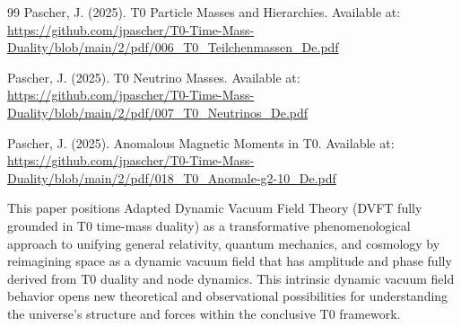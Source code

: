 \begin{thebibliography}{99}
		Pascher, J. (2025). T0 Particle Masses and Hierarchies. Available at: \url{https://github.com/jpascher/T0-Time-Mass-Duality/blob/main/2/pdf/006_T0_Teilchenmassen_De.pdf}
		
		Pascher, J. (2025). T0 Neutrino Masses. Available at: \url{https://github.com/jpascher/T0-Time-Mass-Duality/blob/main/2/pdf/007_T0_Neutrinos_De.pdf}
		
		Pascher, J. (2025). Anomalous Magnetic Moments in T0. Available at: \url{https://github.com/jpascher/T0-Time-Mass-Duality/blob/main/2/pdf/018_T0_Anomale-g2-10_De.pdf}
		
		This paper positions Adapted Dynamic Vacuum Field Theory (DVFT fully grounded in T0 time-mass duality) as a transformative phenomenological approach to unifying general relativity, quantum mechanics, and cosmology by reimagining space as a dynamic vacuum field that has amplitude and phase fully derived from T0 duality and node dynamics. This intrinsic dynamic vacuum field behavior opens new theoretical and observational possibilities for understanding the universe’s structure and forces within the conclusive T0 framework.
	\end{thebibliography}
	